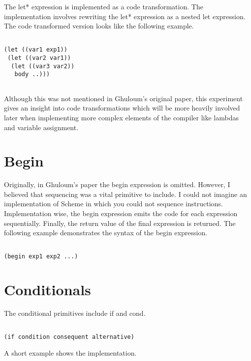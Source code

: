 \documentclass{article}
\begin{document}
The let* expression is implemented as a code transformation. The implementation involves rewriting the let* expression as a nested let expression. The code transformed version looks like the following example.

\begin{verbatim}

(let ((var1 exp1))
 (let ((var2 var1))
  (let ((var3 var2))
   body ..))) 
 
\end{verbatim}

Although this was not mentioned in Ghuloum's original paper, this experiment gives an insight into code transformations which will be more heavily involved later when implementing more complex elements of the compiler like lambdas and variable assignment.

\section{Begin}

Originally, in Ghuloum's paper the begin expression is omitted. However, I believed that sequencing was a vital primitive to include. I could not imagine an implementation of Scheme in which you could not sequence instructions. Implementation wise, the begin expression emits the code for each expression sequentially. Finally, the return value of the final expression is returned. The following example demonstrates the syntax of the begin expression.

\begin{verbatim}

(begin exp1 exp2 ...) 

\end{verbatim}

\section{Conditionals}

The conditional primitives include if and cond. 

\begin{verbatim}

(if condition consequent alternative)

\end{verbatim}

A short example shows the implementation.
\end{document}

